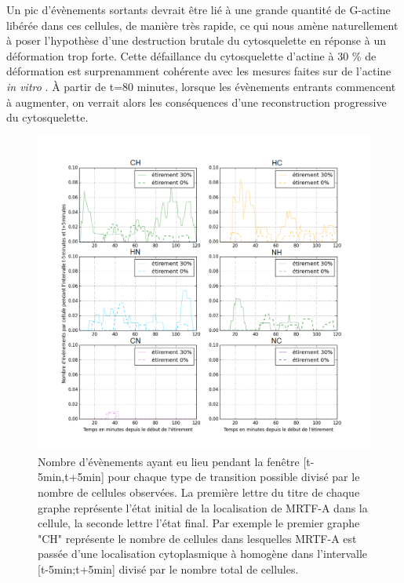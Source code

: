 Un pic d'évènements sortants devrait être lié à une grande quantité de G-actine libérée dans ces cellules, de manière très rapide, ce qui nous amène naturellement à poser l'hypothèse d'une destruction brutale du cytosquelette en réponse à un déformation trop forte. Cette défaillance du cytosquelette d'actine à 30 \% de déformation est surprenamment cohérente avec les mesures faites sur de l'actine \textit{in vitro} \cite{janmey_mechanical_1994}. 
À partir de t=80 minutes, lorsque les évènements entrants commencent à augmenter, on verrait alors les conséquences d'une reconstruction progressive du cytosquelette. 

 
\begin{figure}
\includegraphics[scale=0.5]{Figures/Etirement30_vs_0_translocations.png}
\caption{\label{Et30_transloc} Nombre d'évènements ayant eu lieu pendant la fenêtre [t-5min,t+5min] pour chaque type de transition possible divisé par le nombre de cellules observées. La première lettre du titre de chaque graphe représente l'état initial de la localisation de MRTF-A dans la cellule, la seconde lettre l'état final. Par exemple le premier graphe "CH" représente le nombre de cellules dans lesquelles MRTF-A est passée d'une localisation cytoplasmique à homogène dans l'intervalle [t-5min;t+5min] divisé par le nombre total de cellules. }
\end{figure}

